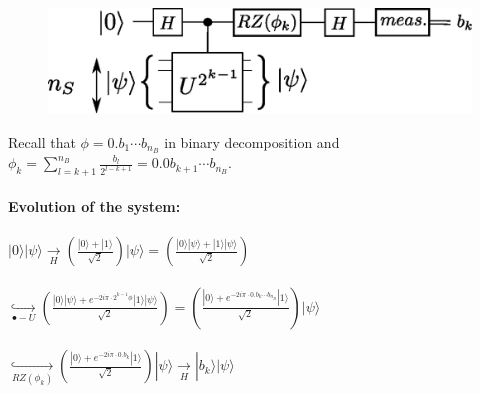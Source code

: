 \documentclass{beamer}
\begin{document}
\begin{frame}
\begin{center}
\begin{figure}
\includegraphics[width=.6\textwidth]{iterative_pea.eps}
\end{figure}
\end{center}
Recall that $\phi=0.b_{1}\cdots b_{n_{B}}$ in binary decomposition 
and $\phi_{k}=\sum_{l=k+1}^{n_{B}} \frac{b_{l}}{2^{l-k+1}}=0.0b_{k+1}\cdots b_{n_{B}}$.\\~\\
\textbf{Evolution of the system:}\\~\\
$|0\rangle|\psi\rangle \underset{H}{\rightarrow} \left(\frac{|0\rangle+|1\rangle}{\sqrt{2}}\right)|\psi\rangle=
\left(\frac{|0\rangle|\psi\rangle+|1\rangle|\psi\rangle}{\sqrt{2}}\right)$\\~\\
$\underset{\bullet-U}{\hookrightarrow}\left(\frac{|0\rangle|\psi\rangle+e^{-2i\pi\cdot 2^{k-1}\phi}|1\rangle|\psi\rangle}{\sqrt{2}}\right)
=\left(\frac{|0\rangle+e^{-2i\pi\cdot 0.b_{k}\cdots b_{n_{B}}}|1\rangle}{\sqrt{2}}\right)|\psi\rangle$\\~\\
$\underset{RZ(\phi_{k})}{\hookrightarrow} \left(\frac{|0\rangle+e^{-2i\pi\cdot 0.b_{k}}|1\rangle}{\sqrt{2}}\right)|\psi\rangle
\underset{H}{\rightarrow}|b_{k}\rangle|\psi\rangle$
\end{frame}
\end{document}
